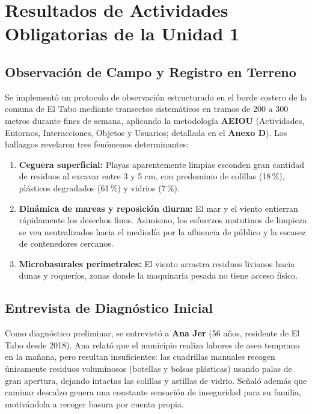 \documentclass[12pt,letterpaper]{article}
\begin{document}
\section{Resultados de Actividades Obligatorias de la Unidad 1}

\subsection{Observación de Campo y Registro en Terreno}
Se implementó un protocolo de observación estructurado en el borde costero de la comuna de El Tabo mediante transectos sistemáticos en tramos de 200 a 300 metros durante fines de semana, aplicando la metodología \textbf{AEIOU} (Actividades, Entornos, Interacciones, Objetos y Usuarios; detallada en el \textbf{Anexo D}). Los hallazgos revelaron tres fenómenos determinantes:
\begin{enumerate}[leftmargin=*, noitemsep, topsep=0pt]
    \item \textbf{Ceguera superficial:} Playas aparentemente limpias esconden gran cantidad de residuos al excavar entre 3 y 5 cm, con predominio de colillas (18\,\%), plásticos degradados (61\,\%) y vidrios (7\,\%).
    \item \textbf{Dinámica de mareas y reposición diurna:} El mar y el viento entierran rápidamente los desechos finos. Asimismo, los esfuerzos matutinos de limpieza se ven neutralizados hacia el mediodía por la afluencia de público y la escasez de contenedores cercanos.
    \item \textbf{Microbasurales perimetrales:} El viento arrastra residuos livianos hacia dunas y roqueríos, zonas donde la maquinaria pesada no tiene acceso físico.
\end{enumerate}

\subsection{Entrevista de Diagnóstico Inicial}
Como diagnóstico preliminar, se entrevistó a \textbf{Ana Jer} (56 años, residente de El Tabo desde 2018). Ana relató que el municipio realiza labores de aseo temprano en la mañana, pero resultan insuficientes: las cuadrillas manuales recogen únicamente residuos voluminosos (botellas y bolsas plásticas) usando palas de gran apertura, dejando intactas las colillas y astillas de vidrio. Señaló además que caminar descalzo genera una constante sensación de inseguridad para su familia, motivándola a recoger basura por cuenta propia.
\end{document}
